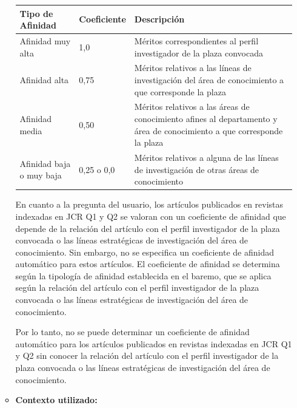 \documentclass{article}
\begin{document}
\begin{itemize}
\begin{itemize}
                        \vspace{0.4cm}
                        \begin{table}[h!]\centering\renewcommand{\arraystretch}{1.3}
                              \begin{tabular}{|p{}|p{}|p{}|}\hline
                                    Tipo de Afinidad         & Coeficiente & Descripción                                                                                                            \\\hline
                                    Afinidad muy alta        & 1,0         & Méritos correspondientes al perfil investigador de la plaza convocada                                                  \\\hline
                                    Afinidad alta            & 0,75        & Méritos relativos a las líneas de investigación del área de conocimiento a que corresponde la plaza                    \\\hline
                                    Afinidad media           & 0,50        & Méritos relativos a las áreas de conocimiento afines al departamento y área de conocimiento a que corresponde la plaza \\\hline
                                    Afinidad baja o muy baja & 0,25 o 0,0  & Méritos relativos a alguna de las líneas de investigación de otras áreas de conocimiento                               \\\hline
                              \end{tabular}\end{table}
                        \vspace{0.4cm}

                        En cuanto a la pregunta del usuario, los artículos publicados en revistas indexadas en JCR Q1 y Q2 se valoran con un coeficiente de afinidad que depende de la relación del artículo con el perfil investigador de la plaza convocada o las líneas estratégicas de investigación del área de conocimiento. Sin embargo, no se especifica un coeficiente de afinidad automático para estos artículos. El coeficiente de afinidad se determina según la tipología de afinidad establecida en el baremo, que se aplica según la relación del artículo con el perfil investigador de la plaza convocada o las líneas estratégicas de investigación del área de conocimiento.

                        Por lo tanto, no se puede determinar un coeficiente de afinidad automático para los artículos publicados en revistas indexadas en JCR Q1 y Q2 sin conocer la relación del artículo con el perfil investigador de la plaza convocada o las líneas estratégicas de investigación del área de conocimiento.
                  \item \textbf{Contexto utilizado:}


\end{itemize}
\end{itemize}
\end{document}
